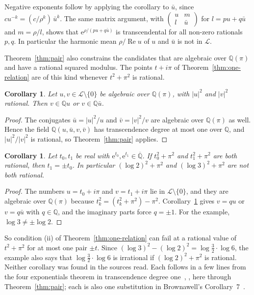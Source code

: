 \documentclass[11pt,a4paper]{article}
\theoremstyle{plain}
\newtheorem{corollary}[theorem]{Corollary}
\theoremstyle{definition}
\newcommand{\e}{\mathrm{e}}
\newcommand{\Q}{\mathbb{Q}}
\newcommand{\Alg}{\overline{\mathbb{Q}}}
\newcommand{\Logs}{\mathcal{L}}
\begin{document}
Negative exponents follow by applying the corollary to $\bar u$, since
$cu^{-k}=(c/\rho^{k})\,\bar u^{k}$. The same matrix argument, with $\begin{pmatrix}u&m\\ l&\bar u\end{pmatrix}$
for $l=pu+q\bar u$ and $m=\rho/l$, shows that $\e^{\rho/(pu+q\bar u)}$ is transcendental for all
non-zero rationals $p,q$. In particular the harmonic mean $\rho/\operatorname{Re}u$ of $u$ and
$\bar u$ is not in $\Logs$.

Theorem~\ref{thm:pair} also constrains the candidates that are algebraic over $\Q(\pi)$ and have a
rational squared modulus. The points $t+i\pi$ of Theorem~\ref{thm:one-relation} are of this kind
whenever $t^{2}+\pi^{2}$ is rational.

\begin{corollary}\label{cor:rational-orbit}
Let $u,v\in\Logs\setminus\{0\}$ be algebraic over $\Q(\pi)$, with $|u|^{2}$ and $|v|^{2}$ rational.
Then $v\in\Q u$ or $v\in\Q\bar u$.
\end{corollary}

\begin{proof}
The conjugates $\bar u=|u|^{2}/u$ and $\bar v=|v|^{2}/v$ are algebraic over $\Q(\pi)$ as well.
Hence the field $\Q(u,\bar u,v,\bar v)$ has transcendence degree at most one over $\Q$, and
$|u|^{2}/|v|^{2}$ is rational, so Theorem~\ref{thm:pair} applies.
\end{proof}

\begin{corollary}\label{cor:torsion-unique}
Let $t_{0},t_{1}$ be real with $\e^{t_{0}},\e^{t_{1}}\in\Alg$. If $t_{0}^{2}+\pi^{2}$ and
$t_{1}^{2}+\pi^{2}$ are both rational, then $t_{1}=\pm t_{0}$. In particular $(\log2)^{2}+\pi^{2}$
and $(\log3)^{2}+\pi^{2}$ are not both rational.
\end{corollary}

\begin{proof}
The numbers $u=t_{0}+i\pi$ and $v=t_{1}+i\pi$ lie in $\Logs\setminus\{0\}$, and they are algebraic
over $\Q(\pi)$ because $t_{k}^{2}=(t_{k}^{2}+\pi^{2})-\pi^{2}$. Corollary~\ref{cor:rational-orbit}
gives $v=qu$ or $v=q\bar u$ with $q\in\Q$, and the imaginary parts force $q=\pm1$. For the example,
$\log3\neq\pm\log2$.
\end{proof}

So condition (ii) of Theorem~\ref{thm:one-relation} can fail at a rational value of $t^{2}+\pi^{2}$
for at most one pair $\pm t$. Since $(\log3)^{2}-(\log2)^{2}=\log\frac{3}{2}\cdot\log6$, the example
also says that $\log\frac{3}{2}\cdot\log6$ is irrational if $(\log2)^{2}+\pi^{2}$ is rational.
Neither corollary was found in the sources read. Each follows in a few lines from the four
exponentials theorem in transcendence degree one~\cite[Corollaire~4]{waldschmidt-1973},
\cite[Theorem~1]{roy-waldschmidt-1995}, here through Theorem~\ref{thm:pair}; each is also one
substitution in Brownawell's Corollary~7~\cite[p.~23]{brownawell-1974}.
\end{document}
